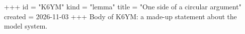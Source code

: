 +++
id = "K6YM"
kind = "lemma"
title = "One side of a circular argument"
created = 2026-11-03
+++
Body of K6YM: a made-up statement about the model system.
